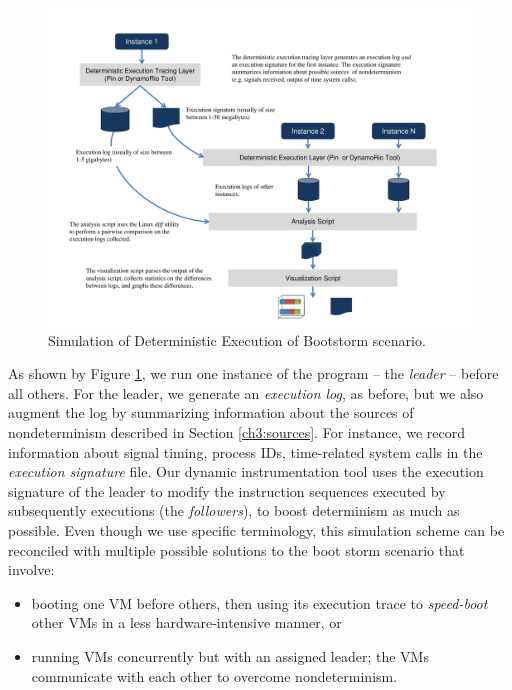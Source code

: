 \begin{figure}[h]
  \center
  \includegraphics[scale=0.7, trim=1cm 0cm 1cm 0cm]
                  {simulation.pdf}
  \caption[Simulation of Deterministic Execution of Bootstorm scenario]%
  {Simulation of Deterministic Execution of Bootstorm scenario.}
  \label{ch3:figsimulation}
\end{figure}

As shown by Figure \ref{ch3:figsimulation}, we run one instance of the
program -- the {\em leader} -- before all others.
For the leader, we generate an {\em execution log}, as before,
but we also augment the log by summarizing information about the sources of nondeterminism
described in Section \ref{ch3:sources}. For instance, we record
information about signal timing, process IDs, time-related system calls
in the {\em execution signature} file. Our dynamic instrumentation tool
uses the execution signature of the leader
to modify the instruction sequences executed by subsequently
executions (the {\em followers}), to boost determinism as much as possible.
Even though we use specific terminology, this simulation scheme can be
reconciled with multiple possible solutions to the 
boot storm scenario that involve:
\begin{itemize}
\item
booting one VM before others,
then using its execution trace to {\em speed-boot} other VMs
in a less hardware-intensive manner, or
\item 
running VMs concurrently but with an assigned leader;
the VMs communicate with each other to overcome
nondeterminism.
\end{itemize}

